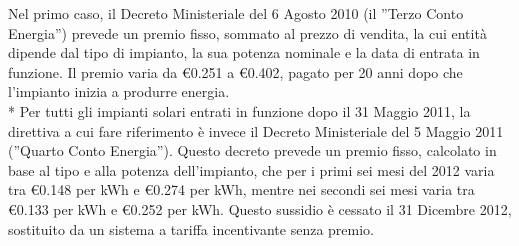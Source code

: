 \documentclass[12pt,a4paper,openright,twoside]{report}
\begin{document}
Nel primo caso, il Decreto Ministeriale del 6 Agosto 2010 (il ''Terzo Conto Energia'') prevede un premio fisso, sommato al prezzo di vendita, la cui entità dipende dal tipo di impianto, la sua potenza nominale e la data di entrata in funzione. Il premio varia da \euro0.251 a \euro0.402, pagato per 20 anni dopo che l'impianto inizia a produrre energia.
\\*
Per tutti gli impianti solari entrati in funzione dopo il 31 Maggio 2011, la direttiva a cui fare riferimento è invece il Decreto Ministeriale del 5 Maggio 2011 (''Quarto Conto Energia''). Questo decreto prevede un premio fisso, calcolato in base al tipo e alla potenza dell'impianto, che per i primi sei mesi del 2012 varia tra \euro0.148 per kWh e \euro0.274 per kWh, mentre nei secondi sei mesi varia tra \euro0.133 per kWh e \euro0.252 per kWh. Questo sussidio è cessato il 31 Dicembre 2012, sostituito da un sistema a tariffa incentivante senza premio.
\end{document}
